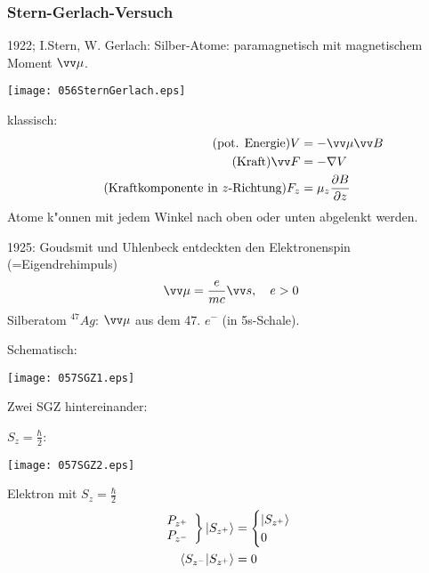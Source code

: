 \documentclass[a4paper]{scrartcl}
\begin{document}
{\subsubsection*{Stern-Gerlach-Versuch}

1922; I.Stern, W. Gerlach: Silber-Atome: paramagnetisch mit magnetischem Moment $\vv \mu$.
\begin{center}
\texttt{[image: 056SternGerlach.eps]}
\end{center}
klassisch:
\begin{align*}
\tag{pot. Energie}  V & = - \vv \mu \vv B\\
\tag{Kraft}  \vv F & = - \nabla V \\
\tag{Kraftkomponente in $z$-Richtung} F_z & = \mu_z \frac {\partial B}{\partial z}
\end{align*}
Atome k"onnen mit jedem Winkel nach oben oder unten abgelenkt werden.

1925: Goudsmit und Uhlenbeck entdeckten den Elektronenspin (=Eigendrehimpuls)
\begin{align}
\vv \mu  = \frac{e}{mc} \vv s, \quad e>0
\end{align}
Silberatom $^{47}Ag$: $\vv \mu$ aus dem 47. $e^-$ (in 5s-Schale).

Schematisch:
\begin{center}
\texttt{[image: 057SGZ1.eps]}
\end{center}

Zwei SGZ hintereinander:
\begin{aaufz}
\item $S_z = \frac \hbar 2$:
\begin{center}
\texttt{[image: 057SGZ2.eps]}
\end{center}
Elektron mit $S_z = \frac \hbar 2$
\begin{align*}
\left. \begin{array}{l} P_{z^+} \\ P_{z^-} \end{array} \right\} \ket{ S_{z^+} } & = \begin{cases} \ket{S_{z^+}} \\ 0 \end{cases} \\
\braket{ S_{z^-} | S_{z^+} } & = 0
\end{align*}


\end{aaufz}}
\end{document}
